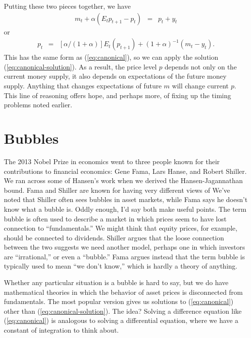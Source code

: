\documentclass[11pt]{article}
\begin{document}
Putting these two pieces together, we have
\begin{eqnarray*}
    m_t + \alpha (E_t p_{t+1} - p_t ) &=& p_t + y_t
\end{eqnarray*}
or
\begin{eqnarray*}
    p_t  &=& [\alpha/(1+\alpha)] E_t (p_{t+1})  + (1+\alpha)^{-1} (m_t- y_t).
\end{eqnarray*}
This has the same form as (\ref{eq:canonical}),
so we can apply the solution (\ref{eq:canonical-solution}).
As a result, the price level $p$ depends not only on the current money
supply, it also depends on expectations of the future money supply.
Anything that changes expectations of future $m$ will change current $p$.
This line of reasoning offers hope, and perhaps more,
of fixing up the timing problems noted earlier.


\section{Bubbles}

The 2013 Nobel Prize in economics went to three people known for their
contributions to financial economics:  Gene Fama, Lars Hanse, and Robert Shiller.
We ran across some of Hansen's work when we derived the Hansen-Jagannathan bound.
Fama and Shiller are known for having very different views of
We've noted that Shiller often sees bubbles in asset markets,
while Fama says he doesn't know what a bubble is.
Oddly enough, I'd say both make useful points.
The term bubble is often used to describe a market in which prices
seem to have lost connection to ``fundamentals.''
We might think that equity prices, for example, should be connected to dividends.
Shiller argues that the loose connection between the two suggests we need another model,
perhaps one in which investors are ``irrational,''
or even a ``bubble.''
Fama argues instead that the term bubble is typically used to mean ``we don't know,''
which is hardly a theory of anything.

Whether any particular situation is a bubble is hard to say,
but we do have mathematical theories in which the behavior of asset prices is
disconnected from fundamentals.
The most popular version gives us solutions to (\ref{eq:canonical})
other than (\ref{eq:canonical-solution}).
The idea?
Solving a difference equation like (\ref{eq:canonical}) is analogous to solving a differential
equation, where we have a constant of integration to think about.
\end{document}
